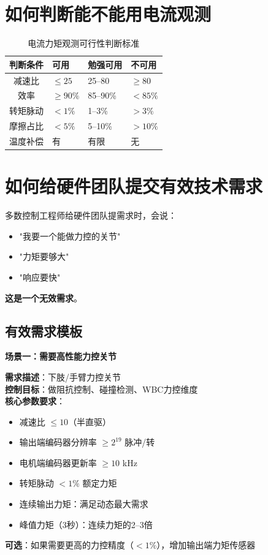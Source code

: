 \section{如何判断能不能用电流观测}

\begin{table}[H]
\centering
\begin{tabular}{cp{3.5cm}p{3.5cm}p{3.5cm}}
\toprule
\textbf{判断条件} & \textbf{可用} & \textbf{勉强可用} & \textbf{不可用} \\
\midrule
减速比 & $\leq 25$ & 25--80 & $\geq 80$ \\
效率 & $\geq 90\%$ & 85--90\% & $< 85\%$ \\
转矩脉动 & $< 1\%$ & 1--3\% & $> 3\%$ \\
摩擦占比 & $< 5\%$ & 5--10\% & $> 10\%$ \\
温度补偿 & 有 & 有限 & 无 \\
\bottomrule
\end{tabular}
\caption{电流力矩观测可行性判断标准}
\label{tab:current_feasibility}
\end{table}

\section{如何给硬件团队提交有效技术需求}

多数控制工程师给硬件团队提需求时，会说：
\begin{itemize}
  \item "我要一个能做力控的关节"
  \item "力矩要够大"
  \item "响应要快"
\end{itemize}

\textbf{这是一个无效需求}。

\subsection{有效需求模板}

\textbf{场景一：需要高性能力控关节}

\begin{tcolorbox}[colback=lightgray]
\textbf{需求描述}：下肢/手臂力控关节\\
\textbf{控制目标}：做阻抗控制、碰撞检测、WBC力控维度\\
\textbf{核心参数要求}：
\begin{itemize}
  \item 减速比 $\leq 10$（半直驱）
  \item 输出端编码器分辨率 $\geq 2^{19}$ 脉冲/转
  \item 电机端编码器更新率 $\geq 10$ kHz
  \item 转矩脉动 $< 1\%$ 额定力矩
  \item 连续输出力矩：满足动态最大需求
  \item 峰值力矩（3秒）：连续力矩的2--3倍
\end{itemize}
\textbf{可选}：如果需要更高的力控精度（$< 1\%$），增加输出端力矩传感器
\end{tcolorbox}

